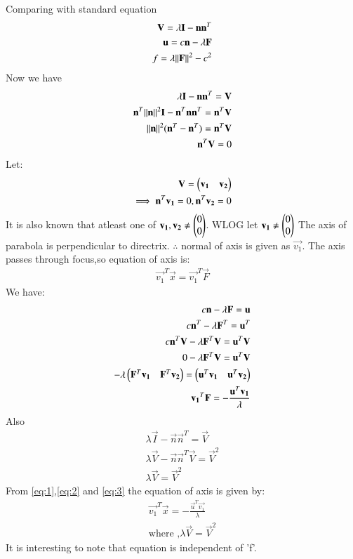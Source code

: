 \documentclass[journal,12pt,twocolumn]{IEEEtran}
\begin{document}
Comparing with standard equation 
\begin{align}
\mathbf{V}=\lambda\mathbf{I}-\mathbf{n}\mathbf{n}^T\\
\mathbf{u}=c\mathbf{n}-\lambda\mathbf{F}\\
f=\lambda\lVert\mathbf{F}\rVert^2-c^2
\end{align}
Now we have
\begin{align}
    \lambda\mathbf{I}-\mathbf{n}\mathbf{n}^T=\mathbf{V}\\
    \mathbf{n}^T\lVert\mathbf{n}\rVert^2\mathbf{I}-\mathbf{n}^T\mathbf{n}\mathbf{n}^T=\mathbf{n}^T\mathbf{V}\\
    \lVert\mathbf{n}\rVert^2(\mathbf{n}^T-\mathbf{n}^T)=\mathbf{n}^T\mathbf{V}\\
    \mathbf{n}^T\mathbf{V}=0
\end{align}
Let:
\begin{align}
    \mathbf{V}=\begin{pmatrix}\mathbf{v_1}&\mathbf{v_2}\end{pmatrix}\\
    \implies\mathbf{n}^T\mathbf{v_1}=0,\mathbf{n}^T\mathbf{v_2}=0
\end{align}
It is also known that atleast one of $\mathbf{v_1},\mathbf{v_2}\neq\begin{pmatrix}0\\0\end{pmatrix}$. WLOG let $\mathbf{v_1}\neq\begin{pmatrix}0\\0\end{pmatrix}$
The axis of parabola is perpendicular to directrix.
$\therefore$ normal of axis is given as $\vec{v_1}$.
The axis passes through focus,so equation of axis is:
\begin{align}
    \vec{v_1}^T\vec{x}=\vec{v_1}^T\vec{F}\label{eq:1}
\end{align}
We have:
\begin{align}
  c\mathbf{n}-\lambda\mathbf{F}=\mathbf{u}\\
  c\mathbf{n}^T-\lambda\mathbf{F}^T=\mathbf{u}^T\\
  c\mathbf{n}^T\mathbf{V}-\lambda\mathbf{F}^T\mathbf{V}=\mathbf{u}^T\mathbf{V}\\
  0-\lambda\mathbf{F}^T\mathbf{V}=\mathbf{u}^T\mathbf{V}\\
  -\lambda\begin{pmatrix}\mathbf{F}^T\mathbf{v_1}&\mathbf{F}^T\mathbf{v_2}\end{pmatrix}=  \begin{pmatrix}\mathbf{u}^T\mathbf{v_1}&\mathbf{u}^T\mathbf{v_2}\end{pmatrix}\\
  \mathbf{v_1}^T\mathbf{F}=-\frac{\mathbf{u}^T\mathbf{v_1}}{\lambda}\label{eq:2}
\end{align}
Also
\begin{align}
    \lambda\vec{I}-\vec{n}\vec{n}^T=\vec{V}\\
    \lambda\vec{V}-\vec{n}\vec{n}^T\vec{V}=\vec{V}^2\\
    \lambda\vec{V}=\vec{V}^2\label{eq:3}
\end{align}
From \ref{eq:1},\ref{eq:2} and \ref{eq:3} the equation of axis is given by:
\begin{align}
    \vec{v_1}^T\vec{x}=-\frac{\vec{u}^T\vec{v_1}}{\lambda}\\
    \text{where ,}\lambda\vec{V}=\vec{V}^2
\end{align}
It is interesting to note that equation is independent of 'f'.
\end{document}
